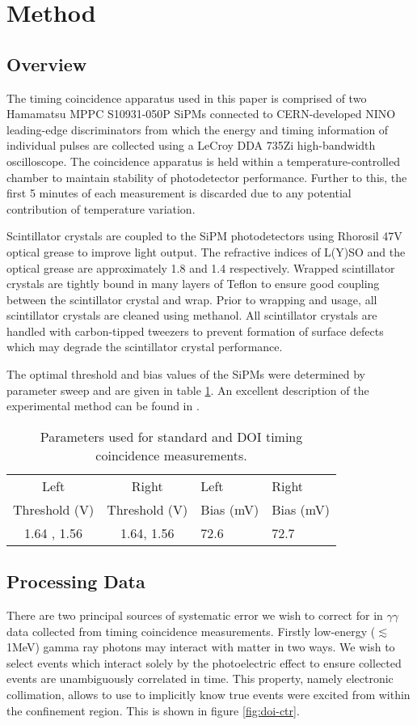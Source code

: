 \section{Method}
\label{sec:method}
\subsection{Overview}
The timing coincidence apparatus used in this paper is comprised of two Hamamatsu MPPC S10931-050P SiPMs connected to CERN-developed NINO leading-edge discriminators from which the energy and timing information of individual pulses are collected using a LeCroy DDA 735Zi high-bandwidth oscilloscope. The coincidence apparatus is held within a temperature-controlled chamber to maintain stability of photodetector performance. Further to this, the first 5 minutes of each measurement is discarded due to any potential contribution of temperature variation.

Scintillator crystals are coupled to the SiPM photodetectors using Rhorosil 47V optical grease to improve light output. The refractive indices of L(Y)SO and the optical grease are approximately 1.8 \cite{Erdei2012781} and 1.4 \cite{rhodorsilgrease} respectively. Wrapped scintillator crystals are tightly bound in many layers of Teflon to ensure good coupling between the scintillator crystal and wrap. Prior to wrapping and usage, all scintillator crystals are cleaned using methanol. All scintillator crystals are handled with carbon-tipped tweezers to prevent formation of surface defects which may degrade the scintillator crystal performance. 

The optimal threshold and bias values of the SiPMs were determined by parameter sweep and are given in table \ref{tab:optimumparam}. An excellent description of the experimental method can be found in \cite{ch_Meyer_Pizzichemi_Lecoq_2013}.

\begin{table}
\caption{\label{tab:optimumparam} Parameters used for standard and DOI timing coincidence measurements.} 
\begin{tabular}{ccll}
\hline
Left &  Right & Left & Right\\
Threshold (V) & Threshold (V)& Bias (mV) & Bias (mV)\\
\hline
1.64 , 1.56 &  1.64, 1.56 &  72.6 &  72.7\\
\hline
\end{tabular}
\end{table}

\subsection{Processing Data}
There are two principal sources of systematic error we wish to correct for in $\gamma\gamma$ data collected from timing coincidence measurements. Firstly low-energy ($\lesssim$1MeV) gamma ray photons may interact with matter in two ways. We wish to select events which interact solely by the photoelectric effect to ensure collected events are unambiguously correlated in time. This property, namely electronic collimation, allows to use to implicitly know true events were excited from within the confinement region. This is shown in figure \ref{fig:doi-ctr}.

